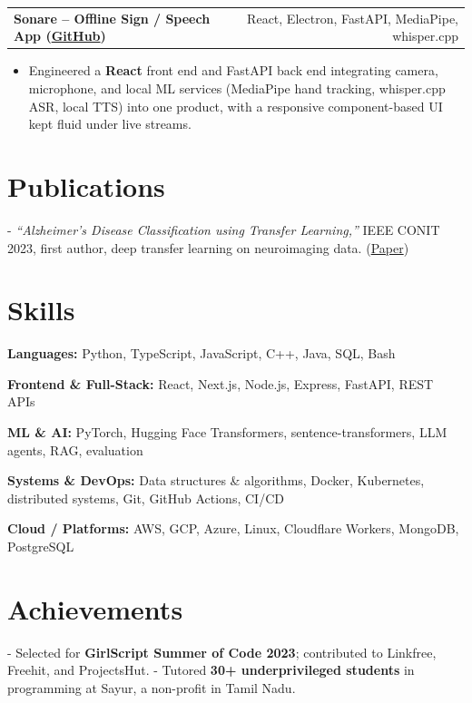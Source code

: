 \documentclass[letterpaper,11pt]{article}
\makeatletter
\newcommand{\projItem}[2]{%
  \vspace{6pt}
  \begin{tabular*}{\textwidth}{@{}l@{\extracolsep{\fill}}r@{}}
    \textbf{#1} & #2 \\
  \end{tabular*}\par\vspace{-2pt}
}
\newcommand{\skillLine}[2]{\textbf{#1:} #2\par\vspace{2pt}}
\newcommand{\inlineBlock}[1]{{\setlength{\leftskip}{0.18in}\small #1\par}}
\makeatother
\begin{document}
\projItem{Sonare -- Offline Sign / Speech App {\normalfont\small(\href{https://github.com/Deva-1903/Qualcomm-Sep25-Team-Sonare}{GitHub})}}{React, Electron, FastAPI, MediaPipe, whisper.cpp}
\begin{itemize}
  \item Engineered a \textbf{React} front end and FastAPI back end integrating camera, microphone, and local ML services (MediaPipe hand tracking, whisper.cpp ASR, local TTS) into one product, with a responsive component-based UI kept fluid under live streams.
\end{itemize}

\section{Publications}
\inlineBlock{- \textit{``Alzheimer's Disease Classification using Transfer Learning,''} IEEE CONIT 2023, first author, deep transfer learning on neuroimaging data. {\normalfont\small(\href{https://ieeexplore.ieee.org/document/10205760}{Paper})}}

\section{Skills}
\skillLine{Languages}{Python, TypeScript, JavaScript, C++, Java, SQL, Bash}
\skillLine{Frontend \& Full-Stack}{React, Next.js, Node.js, Express, FastAPI, REST APIs}
\skillLine{ML \& AI}{PyTorch, Hugging Face Transformers, sentence-transformers, LLM agents, RAG, evaluation}
\skillLine{Systems \& DevOps}{Data structures \& algorithms, Docker, Kubernetes, distributed systems, Git, GitHub Actions, CI/CD}
\skillLine{Cloud / Platforms}{AWS, GCP, Azure, Linux, Cloudflare Workers, MongoDB, PostgreSQL}

\section{Achievements}
\inlineBlock{- Selected for \textbf{GirlScript Summer of Code 2023}; contributed to Linkfree, Freehit, and ProjectsHut. - Tutored \textbf{30+ underprivileged students} in programming at Sayur, a non-profit in Tamil Nadu.}
\end{document}
